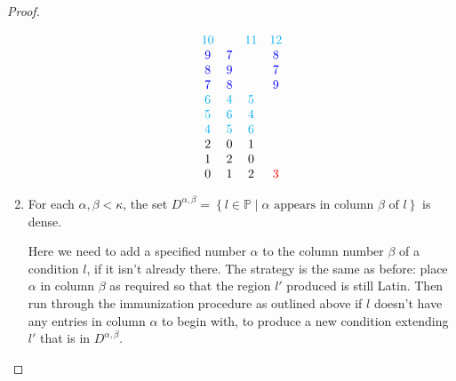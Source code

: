 \documentclass[12pt,a4paper]{article}
\newcommand{\st}{\; | \;}
\newcommand{\set}[2]{\left\{#1\st #2 \right\}}
\renewcommand{\P}{\mathbb{P}}
\begin{document}
\begin{proof}
\begin{enumerate}
$$\begin{array}{cccc}
						\color{cyan}10&&\color{cyan}11&\color{cyan}12\\
						\color{blue}9&\color{blue}7&&\color{blue}8\\
						\color{blue}8&\color{blue}9&&\color{blue}7\\
						\color{blue}7&\color{blue}8&&\color{blue}9\\
						\color{cyan}6&\color{cyan}4&\color{cyan}5&\\
						\color{cyan}5&\color{cyan}6&\color{cyan}4&\\
						\color{cyan}4&\color{cyan}5&\color{cyan}6&\\
						2  & 0   &  1 &\\ 
						1 & 2 &  0 &  \\
						0  & 1 & 2 & {\textcolor{red} 3}
		\end{array}$$
	
		\item For each $\alpha, \beta<\kappa$, the set $D^{\alpha, \beta}=\set{l\in \P}{\alpha \text{ appears in column } \beta \text{ of } l}$ is dense. 
		
		Here we need to add a specified number $\alpha$ to the column number $\beta$ of a condition $l$, if it isn't already there. The strategy is the same as before: place $\alpha$ in column $\beta$ as required so that the region $l'$ produced is still Latin. Then run through the immunization procedure as outlined above if $l$ doesn't have any entries in column $\alpha$ to begin with, to produce a new condition extending $l'$ that is in $D^{\alpha, \beta}$.
%		
		

\end{enumerate}
\end{proof}
\end{document}
